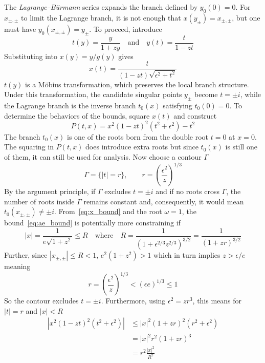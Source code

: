 \documentclass[a4paper]{amsart}
\begin{document}
The \emph{Lagrange–B\"urmann} series expands the branch defined by $y_0(0)=0$. For $x_{\pm,\pm}$ to limit the Lagrange branch, it is not enough that $x(y_\pm)=x_{\pm,\pm}$, but one must have $y_0(x_{\pm,\pm})=y_\pm$.
To proceed, introduce
\begin{equation*}
t(y)=\frac{y}{1+zy}\quad\text{and}\quad y(t)=\frac{t}{1-zt}
\end{equation*}
Substituting into $x(y)=y/g(y)$ gives
\begin{equation*}
x(t)=\frac{t}{(1-zt)\sqrt{\epsilon^2+t^2}}
\end{equation*}
$t(y)$ is a M\"{o}bius transformation, which preserves the local branch structure. Under this transformation, the candidate singular points $y_\pm$ become $t=\pm i$, while the Lagrange branch is the inverse branch $t_0(x)$ satisfying $t_0(0)=0$.
%
To determine the behaviors of the bounds, square $x(t)$ and construct
\begin{equation*}
P(t,x)=x^2(1-zt)^2(t^2+\epsilon^2)-t^2
\end{equation*}
The branch $t_0(x)$ is one of the roots born from the double root $t=0$ at $x=0$. The squaring in $P(t,x)$ does introduce extra roots but since $t_0(x)$ is still one of them, it can still be used for analysis. Now choose a contour $\Gamma$
\begin{equation*}
\Gamma=\{|t|=r\},\qquad r=\left(\frac{\epsilon^2}{z}\right)^{1/3}
\end{equation*}
By the argument principle, if $\Gamma$ excludes $t=\pm i$ and if no roots cross $\Gamma$, the number of roots inside $\Gamma$ remains constant and, consequently, it would mean $t_0(x_{\pm,\pm})\neq\pm i$.
From~\eqref{eq:x_bound} and the root $\omega=1$, the bound~\eqref{eq:ae_bound} is potentially more constraining if
\begin{equation*}
|x|=\frac{1}{e\sqrt{1+z^2}}\leq R\quad\text{where}\quad R=\frac{1}{(1+\epsilon^{2/3}z^{2/3})^{3/2}}=\frac{1}{(1+zr)^{3/2}}
\end{equation*}
Further, since $|x_{\pm,\pm}|\leq R<1$, $e^2(1+z^2)>1$ which in turn implies $z>\epsilon/e$ meaning
\begin{equation*}
r=\left(\frac{\epsilon^2}{z}\right)^{1/3}
<\left(\epsilon e\right)^{1/3}\leq 1
\end{equation*}
So the contour excludes $t=\pm i$.
Furthermore, using $\epsilon^2=zr^3$, this means for $|t|=r$ and $|x|<R$
\begin{align}
\label{eq:P_triangle}\left|x^2(1-zt)^2(t^2+\epsilon^2)\right|
&\leq |x|^2(1+zr)^2(r^2+\epsilon^2)\\
\nonumber&=|x|^2r^2(1+zr)^3\\
\nonumber&=r^2\frac{|x|^2}{R^2}
\end{align}
\end{document}
